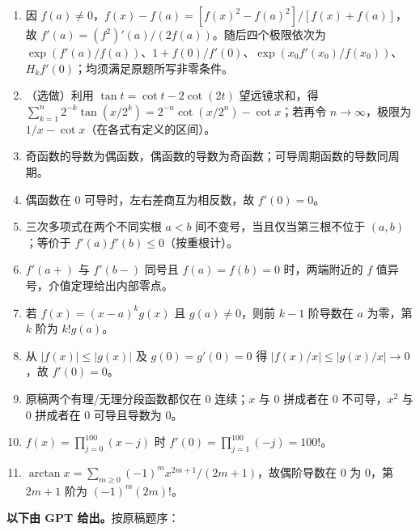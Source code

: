 \begin{enumerate}
\item 因 $f(a)\ne0$，$f(x)-f(a)=[f(x)^2-f(a)^2]/[f(x)+f(a)]$，故 $f'(a)=(f^2)'(a)/(2f(a))$。随后四个极限依次为 $\exp(f'(a)/f(a))$、$1+f(0)/f'(0)$、$\exp(x_0f'(x_0)/f(x_0))$、$H_k f'(0)$；均须满足原题所写非零条件。
\item（选做）利用 $\tan t=\cot t-2\cot(2t)$ 望远镜求和，得 $\sum_{k=1}^n2^{-k}\tan(x/2^k)=2^{-n}\cot(x/2^n)-\cot x$；若再令 $n\to\infty$，极限为 $1/x-\cot x$（在各式有定义的区间）。
\item 奇函数的导数为偶函数，偶函数的导数为奇函数；可导周期函数的导数同周期。
\item 偶函数在 $0$ 可导时，左右差商互为相反数，故 $f'(0)=0$。
\item 三次多项式在两个不同实根 $a<b$ 间不变号，当且仅当第三根不位于 $(a,b)$；等价于 $f'(a)f'(b)\le0$（按重根计）。
\item $f'(a+)$ 与 $f'(b-)$ 同号且 $f(a)=f(b)=0$ 时，两端附近的 $f$ 值异号，介值定理给出内部零点。
\item 若 $f(x)=(x-a)^k g(x)$ 且 $g(a)\ne0$，则前 $k-1$ 阶导数在 $a$ 为零，第 $k$ 阶为 $k!g(a)$。
\item 从 $|f(x)|\le |g(x)|$ 及 $g(0)=g'(0)=0$ 得 $|f(x)/x|\le|g(x)/x|\to0$，故 $f'(0)=0$。
\item 原稿两个有理/无理分段函数都仅在 $0$ 连续；$x$ 与 $0$ 拼成者在 $0$ 不可导，$x^2$ 与 $0$ 拼成者在 $0$ 可导且导数为 $0$。
\item $f(x)=\prod_{j=0}^{100}(x-j)$ 时 $f'(0)=\prod_{j=1}^{100}(-j)=100!$。
\item $\arctan x=\sum_{m\ge0}(-1)^m x^{2m+1}/(2m+1)$，故偶阶导数在 $0$ 为 $0$，第 $2m+1$ 阶为 $(-1)^m(2m)!$。
\end{enumerate}
\noindent\textbf{以下由 GPT 给出。}按原稿题序：
